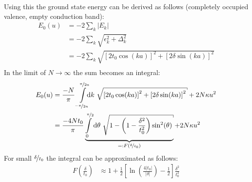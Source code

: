 Using this the ground state energy can be derived as follows (completely occupied valence, empty conduction band):
\begin{align}
E_0(u) &=-2\sum_k |E_k|\\
&= -2\sum_k \sqrt{\epsilon_k^2+\Delta_k^2}\\
&= -2\sum_k \sqrt{\left[2t_0\cos(ka)\right]^2+\left[2\delta\sin(ka)\right]^2}\\
\end{align}
In the limit of $N \rightarrow \infty$ the sum becomes an integral:
\begin{align}
E_0(u) &= \frac{-N}{\pi}\int\limits_{\nicefrac{-\pi}{2a}}^{\nicefrac{\pi}{2a}}\hspace*{-0.2cm}\text{d}k\ \sqrt{\left[2t_0\cos(ka)\right]^2+\left[2\delta\sin(ka)\right]^2} + 2N\kappa u^2\\
&=\frac{-4Nt_0}{\pi}\underbrace{\int\limits_{0}^{\nicefrac{\pi}{2}}\text{d}\theta\ \sqrt{1-\left(1-\frac{\delta^2}{t_0^2}\right)\sin^2(\theta)}}_{=:F(\nicefrac{\delta}{t_0})} + 2N\kappa u^2
\end{align}
For small $\nicefrac{\delta}{t_0}$ the integral can be approximated as follows:
\begin{align}
F\left(\frac{\delta}{t_0}\right) &\approx 1 + \frac{1}{2} \left[\ln\left(\frac{4|t_0|}{|\delta|}\right)-\frac{1}{2}\right]\frac{\delta^2}{t_0^2} 
\end{align}


